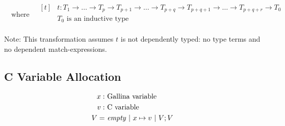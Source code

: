 \documentclass[a4paper,fleqn]{article}
\def\gallina{\textrm{Gallina}}
\newcommand{\kwmatch}{\mbox{\color{mygreen}\ttfamily match}}
\begin{document}
\[ \quad\text{where} \quad
  \begin{aligned}[t]
    & t : T_1 \rightarrow \dots \rightarrow T_p \rightarrow
          T_{p+1} \rightarrow \dots \rightarrow T_{p+q} \rightarrow
          T_{p+q+1} \rightarrow \dots \rightarrow T_{p+q+r} \rightarrow T_0 \\
    & \text{$T_0$ is an inductive type} \\
  \end{aligned}
\]
\raggedright
{\small Note: \quad This transformation assumes $t$ is not dependently typed: no type terms and no dependent \kwmatch-expressions.}

\subsection{C Variable Allocation}\label{sec:cvaralloc}

\begin{align*}
  x :&\ \mbox{\gallina{} variable} \\
  v :&\ \mbox{C variable} \\
  V =&\ \mathit{empty} ~|~ x \mapsto v ~|~ V;V
\end{align*}
\end{document}
